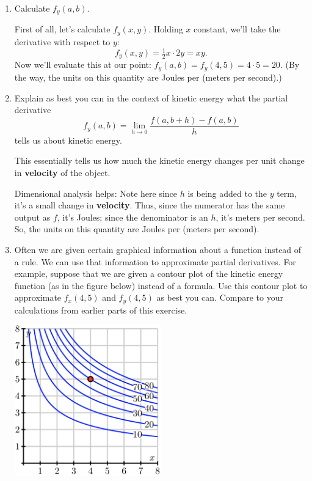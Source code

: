 \begin{enumerate}[leftmargin=0pt]
\begin{enumerate}
        \item Calculate $f_y(a,b)$.
        
        \begin{red}
            First of all, let's calculate $f_y(x,y).$ Holding $x$ constant, we'll take the derivative with respect to $y$:
            \[f_y(x,y) = \tfrac{1}{2}x\cdot 2y = xy.\]
            Now we'll evaluate this at our point: $f_y(a, b) = f_y(4, 5) = 4 \cdot 5 = 20.$
            (By the way, the units on this quantity are Joules per (meters per second).)
            
            
        \end{red}
        
        \item Explain as best you can in the context of kinetic energy what the partial derivative
        \[f_{y}(a, b)=\lim _{h \rightarrow 0} \frac{f(a, b+h)-f(a, b)}{h}\]
        tells us about kinetic energy.
        
        \begin{red}
            This essentially tells us how much the kinetic energy changes per unit change in \textbf{velocity} of the object. 
            
            Dimensional analysis helps: Note here since $h$ is being added to the $y$ term, it's a small change in \textbf{velocity}. Thus, since the numerator has the same output as $f$, it's Joules; since the denominator is an $h$, it's meters per second. So, the units on this quantity are Joules per (meters per second).
        \end{red}
        
        \item Often we are given certain graphical information about a function instead of a rule. We can use that information to approximate partial derivatives. For example, suppose that we are given a contour plot of the kinetic energy function (as in the figure below) instead of a formula. Use this contour plot to approximate $f_x(4, 5)$ and $f_y(4, 5)$ as best you can. Compare to your calculations from earlier parts of this exercise.
        
        \begin{center}
            \includegraphics[width=0.5\textwidth]{../images/10-2-14.png}
        \end{center}
        

\end{enumerate}
\end{enumerate}
